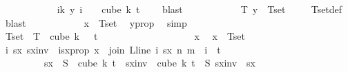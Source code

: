 \begin{isabellebody}
\ \ \ \ \ \ \ \ \ \ \isamarkupfalse%
\ {\isacartoucheopen}{\isacharparenleft}{\kern0pt}{\isasymlambda}i{\isasymin}{\isacharbraceleft}{\kern0pt}{\isachardot}{\kern0pt}{\isachardot}{\kern0pt}{\isacharless}{\kern0pt}k{\isacharbraceright}{\kern0pt}{\isachardot}{\kern0pt}\ y\ {\isacharparenleft}{\kern0pt}i\ {\isacharplus}{\kern0pt}\ {}{\isacharparenright}{\kern0pt}{\isacharparenright}{\kern0pt}\ {\isasymin}\ cube\ k\ {\isacharparenleft}{\kern0pt}t\ {\isacharplus}{\kern0pt}\ {}{\isacharparenright}{\kern0pt}{\isacartoucheclose}\ \isamarkupfalse%
\ blast\isanewline
\ \ \ \ \ \ \ \ \isamarkupfalse%
\ \isamarkupfalse%
\ {\isachardoublequoteopen}T\ y\ {\isasymin}\ Tset{\isachardoublequoteclose}\ \isamarkupfalse%
\ {\isacharasterisk}{\kern0pt}\ \isamarkupfalse%
\ Tset{\isacharunderscore}{\kern0pt}def\ \isamarkupfalse%
\ blast\isanewline
\ \ \ \ \ \ \ \ \isamarkupfalse%
\ \isamarkupfalse%
\ {\isachardoublequoteopen}x\ {\isasymin}\ Tset{\isachardoublequoteclose}\ \isamarkupfalse%
\ y{\isacharunderscore}{\kern0pt}prop\ \isamarkupfalse%
\ simp\isanewline
\ \ \ \ \ \ \isamarkupfalse%
\isanewline
\isanewline
\ \ \ \ \ \ \isamarkupfalse%
\ {\isachardoublequoteopen}Tset\ {\isasymsubseteq}\ T\ {\isacharbackquote}{\kern0pt}\ cube\ {\isacharparenleft}{\kern0pt}k\ {\isacharplus}{\kern0pt}\ {}{\isacharparenright}{\kern0pt}\ {\isacharparenleft}{\kern0pt}t\ {\isacharplus}{\kern0pt}\ {}{\isacharparenright}{\kern0pt}{\isachardoublequoteclose}\ \isanewline
\ \ \ \ \ \ \isamarkupfalse%
\isanewline
\ \ \ \ \ \ \ \ \isamarkupfalse%
\ x\ \isamarkupfalse%
\ {\isachardoublequoteopen}x\ {\isasymin}\ Tset{\isachardoublequoteclose}\isanewline
\ \ \ \ \ \ \ \ \isamarkupfalse%
\ \isamarkupfalse%
\ i\ sx\ sxinv\ \ isx{\isacharunderscore}{\kern0pt}prop{\isacharcolon}{\kern0pt}\ {\isachardoublequoteopen}x\ {\isacharequal}{\kern0pt}\ join\ {\isacharparenleft}{\kern0pt}L{\isacharunderscore}{\kern0pt}line\ i{\isacharparenright}{\kern0pt}\ sx\ n\ m\ {\isasymand}\ i\ {\isasymin}\ {\isacharbraceleft}{\kern0pt}{\isachardot}{\kern0pt}{\isachardot}{\kern0pt}{\isacharless}{\kern0pt}t{\isacharplus}{\kern0pt}{}{\isacharbraceright}{\kern0pt}\isanewline
\ \ \ \ \ \ \ \ {\isasymand}\ sx\ {\isasymin}\ S\ {\isacharbackquote}{\kern0pt}\ {\isacharparenleft}{\kern0pt}cube\ k\ {\isacharparenleft}{\kern0pt}t{\isacharplus}{\kern0pt}{}{\isacharparenright}{\kern0pt}{\isacharparenright}{\kern0pt}\ {\isasymand}\ sxinv\ {\isasymin}\ cube\ k\ {\isacharparenleft}{\kern0pt}t{\isacharplus}{\kern0pt}{}{\isacharparenright}{\kern0pt}\ {\isasymand}\ S\ sxinv\ {\isacharequal}{\kern0pt}\ sx{\isachardoublequoteclose}\isanewline

\end{isabellebody}

